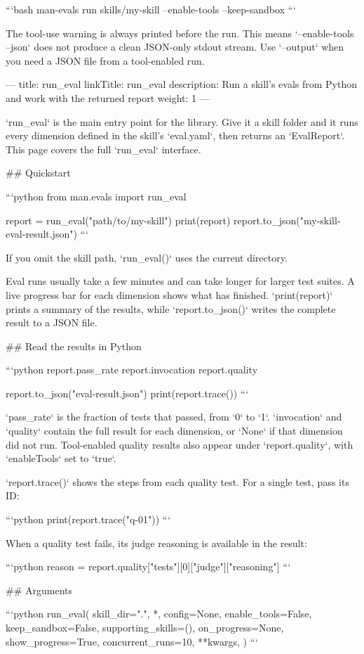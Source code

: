 ```bash
man-evals run skills/my-skill --enable-tools --keep-sandbox
```

The tool-use warning is always printed before the run.
This means `--enable-tools --json` does not produce a clean JSON-only stdout stream.
Use `--output` when you need a JSON file from a tool-enabled run.


---
title: run_eval
linkTitle: run_eval
description: Run a skill's evals from Python and work with the returned report
weight: 1
---

`run_eval` is the main entry point for the library.
Give it a skill folder and it runs every dimension defined in the skill's `eval.yaml`, then returns an `EvalReport`.
This page covers the full `run_eval` interface.

## Quickstart

```python
from man.evals import run_eval

report = run_eval("path/to/my-skill")
print(report)
report.to_json("my-skill-eval-result.json")
```

If you omit the skill path, `run_eval()` uses the current directory.

Eval runs usually take a few minutes and can take longer for larger test suites.
A live progress bar for each dimension shows what has finished.
`print(report)` prints a summary of the results, while `report.to_json()` writes the complete result to a JSON file.

## Read the results in Python

```python
report.pass_rate
report.invocation
report.quality

report.to_json("eval-result.json")
print(report.trace())
```

`pass_rate` is the fraction of tests that passed, from `0` to `1`.
`invocation` and `quality` contain the full result for each dimension, or `None` if that dimension did not run.
Tool-enabled quality results also appear under `report.quality`, with `enableTools` set to `true`.

`report.trace()` shows the steps from each quality test.
For a single test, pass its ID:

```python
print(report.trace("q-01"))
```

When a quality test fails, its judge reasoning is available in the result:

```python
reason = report.quality["tests"][0]["judge"]["reasoning"]
```

## Arguments

```python
run_eval(
    skill_dir=".",
    *,
    config=None,
    enable_tools=False,
    keep_sandbox=False,
    supporting_skills=(),
    on_progress=None,
    show_progress=True,
    concurrent_runs=10,
    **kwargs,
)
```

